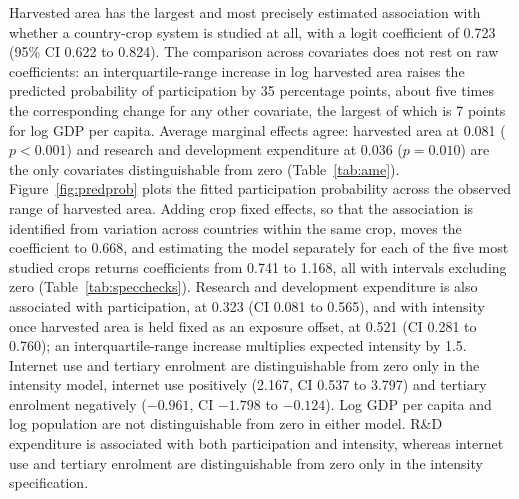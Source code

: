 \documentclass[ASNA,twocolumn]{USG}
\begin{document}
Harvested area has the largest and most precisely estimated association with whether a
country-crop system is studied at all, with a logit coefficient of 0.723 (95\% CI 0.622 to 0.824). The comparison across covariates does not rest on raw coefficients: an
interquartile-range increase in log harvested area raises the predicted probability of
participation by 35 percentage points, about five times the corresponding change for any
other covariate, the largest of which is 7
points for log GDP per capita. Average marginal effects agree: harvested area at 0.081 ($p < 0.001$) and research and
development expenditure at 0.036 ($p = 0.010$) are the only covariates distinguishable from zero
(Table~\ref{tab:ame}). Figure~\ref{fig:predprob} plots the fitted participation probability
across the observed range of harvested area. Adding crop fixed effects, so that the association is identified from variation across countries
within the same crop, moves the coefficient to 0.668, and estimating the model
separately for each of the five most studied crops returns coefficients from 0.741 to 1.168, all
with intervals excluding zero (Table~\ref{tab:specchecks}). Research and development expenditure is also associated with participation, at 0.323 (CI 0.081 to
0.565), and with intensity once harvested area is held fixed as an exposure offset, at 0.521 (CI
0.281 to 0.760); an interquartile-range increase multiplies expected intensity by 1.5. Internet use
and tertiary enrolment are distinguishable from zero only in the intensity model, internet use
positively (2.167, CI 0.537 to 3.797) and tertiary enrolment negatively ($-0.961$, CI $-1.798$ to
$-0.124$). Log GDP per capita and log population are not distinguishable from zero in either model.
R\&D expenditure is associated with both participation and intensity, whereas internet use and
tertiary enrolment are distinguishable from zero only in the intensity specification.
\end{document}
